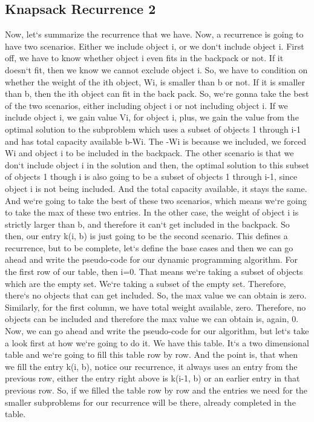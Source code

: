 \subsection{Knapsack  Recurrence 2}
Now, let`s summarize the recurrence that we have.
Now, a recurrence is going to have two scenarios.
Either we include object i, or we don`t include object i.
First off, we have to know whether object i even fits in the backpack or not.
If it doesn`t fit, then we know we cannot exclude object i.
So, we have to condition on whether the weight of the ith object, Wi, is smaller than b or not.
If it is smaller than b, then the ith object can fit in the back pack.
So, we`re gonna take the best of the two scenarios, either including object i or not including object i.
If we include object i, we gain value Vi, for object i, plus, we gain the value from the optimal solution to the subproblem which uses a subset of objects 1 through i-1 and has total capacity available b-Wi.
The -Wi is because we included, we forced Wi and object i to be included in the backpack.
The other scenario is that we don`t include object i in the solution and then, the optimal solution to this subset of objects 1 though i is also going to be a subset of objects 1 through i-1, since object i is not being included.
And the total capacity available, it stays the same.
And we`re going to take the best of these two scenarios, which means we`re going to take the max of these two entries.
In the other case, the weight of object i is strictly larger than b, and therefore it can`t get included in the backpack.
So then, our entry k(i, b) is just going to be the second scenario.
This defines a recurrence, but to be complete, let`s define the base cases and then we can go ahead and write the pseudo-code for our dynamic programming algorithm.
For the first row of our table, then i=0.
That means we`re taking a subset of objects which are the empty set.
We`re taking a subset of the empty set.
Therefore, there`s no objects that can get included.
So, the max value we can obtain is zero.
Similarly, for the first column, we have total weight available, zero.
Therefore, no objects can be included and therefore the max value we can obtain is, again, 0.
Now, we can go ahead and write the pseudo-code for our algorithm, but let`s take a look first at how we`re going to do it.
We have this table.
It`s a two dimensional table and we`re going to fill this table row by row.
And the point is, that when we fill the entry k(i, b), notice our recurrence, it always uses an entry from the previous row, either the entry right above is k(i-1, b) or an earlier entry in that previous row.
So, if we filled the table row by row and the entries we need for the smaller subproblems for our recurrence will be there, already completed in the table.

